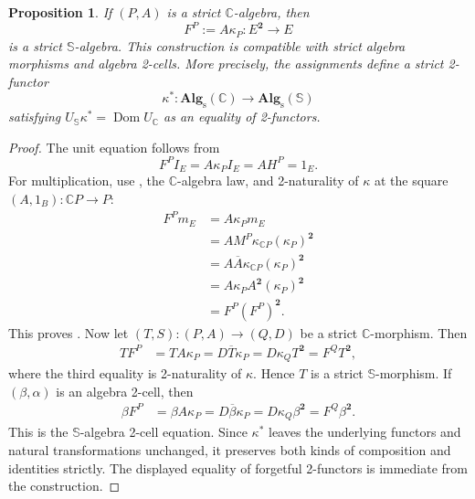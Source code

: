 \documentclass[11pt]{article}
\theoremstyle{plain}
\newtheorem{proposition}[theorem]{Proposition}
\theoremstyle{definition}
\theoremstyle{remark}
\newcommand{\Alg}{\mathbf{Alg}_{\mathrm{s}}}
\newcommand{\Dom}{\operatorname{Dom}}
\newcommand{\C}{\mathbb{C}}
\newcommand{\Sq}{\mathbb{S}}
\numberwithin{equation}{section}
\begin{document}
\begin{proposition}\label{prop:action-to-square-action}
If $(P,A)$ is a strict $\C$-algebra, then
\begin{equation}
F^{P}:=A\kappa_P\colon E^{\mathbf 2}\longrightarrow E
  \label{eq:FP}
\end{equation}
is a strict $\Sq$-algebra.  This construction is compatible with
strict algebra morphisms and algebra 2-cells.  More precisely, the
assignments define a strict 2-functor
\begin{equation}
  \kappa^{*}\colon\Alg(\C)\longrightarrow\Alg(\Sq)
  \label{eq:kappa-pullback}
\end{equation}
satisfying $U_{\Sq}\kappa^{*}=\Dom U_{\C}$ as an equality of 2-functors.
\end{proposition}

\begin{proof}
The unit equation follows from
\begin{equation*}
F^{P}I_E=A\kappa_PI_E=AH^{P}=1_E.
\end{equation*}
For multiplication, use , the
$\C$-algebra law, and 2-naturality of $\kappa$ at the square
$(A,1_B)\colon\C P\to P$:
\begin{align*}
  F^{P}m_E
  &=A\kappa_Pm_E\\
  &=AM^{P}\kappa_{\C P}(\kappa_P)^{\mathbf 2}\\
  &=A\overline A\kappa_{\C P}(\kappa_P)^{\mathbf 2}\\
  &=A\kappa_P A^{\mathbf 2}(\kappa_P)^{\mathbf 2}\\
  &=F^{P}(F^{P})^{\mathbf 2}.
\end{align*}
This proves .  Now let
$(T,S)\colon(P,A)\to(Q,D)$ be a strict $\C$-morphism.  Then
\begin{align*}
  TF^{P}
  &=TA\kappa_P
   =D\overline T\kappa_P
   =D\kappa_QT^{\mathbf 2}
   =F^{Q}T^{\mathbf 2},
\end{align*}
where the third equality is 2-naturality of $\kappa$.  Hence $T$ is a
strict $\Sq$-morphism.  If $(\beta,\alpha)$ is an algebra 2-cell, then
\begin{align*}
  \beta F^{P}
  &=\beta A\kappa_P
   =D\overline\beta\kappa_P
   =D\kappa_Q\beta^{\mathbf 2}
   =F^{Q}\beta^{\mathbf 2}.
\end{align*}
This is the $\Sq$-algebra 2-cell equation.
Since $\kappa^{*}$ leaves the underlying functors and natural
transformations unchanged, it preserves both kinds of composition and
identities strictly.  The displayed equality of forgetful 2-functors
is immediate from the construction.
\end{proof}
\end{document}
